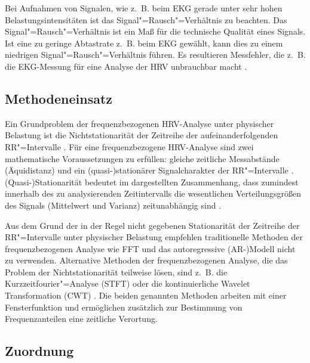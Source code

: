 Bei Aufnahmen von Signalen, wie z.~B. beim \ac{EKG} gerade unter sehr hohen Belastungsintensitäten ist das Signal"=Rausch"=Verhältnis zu beachten. Das Signal"=Rausch"=Verhältnis ist ein Maß für die technische Qualität eines Signals. Ist eine zu geringe Abtastrate z.~B. beim \ac{EKG} gewählt, kann dies zu einem niedrigen Signal"=Rausch"=Verhältnis führen. Es resultieren Messfehler, die z.~B. die \ac{EKG}-Messung für eine Analyse der \acs{HRV} unbrauchbar macht \citep{Hoos2010}.

\subsection{Methodeneinsatz} 

\label{sub:methodeneinsatz}

Ein Grundproblem der frequenzbezogenen \acs{HRV}-Analyse unter physischer Belastung ist die Nichtstationarität der Zeitreihe der aufeinanderfolgenden RR"=Intervalle \citep{Hottenrott2006}. Für eine frequenzbezogene \acs{HRV}-Analyse sind zwei mathematische Voraussetzungen zu erfüllen: gleiche zeitliche Messabstände (Äquidistanz) und ein (quasi-)stationärer Signalcharakter der RR"=Intervalle \citep{Hoos2006}. (Quasi-)Stationarität bedeutet im dargestellten Zusammenhang, dass zumindest innerhalb des zu analysierenden Zeitintervalls die wesentlichen Verteilungsgrößen des Signals (Mittelwert und Varianz) zeitunabhängig sind \citep{Hoos2006}.

Aus dem Grund der in der Regel nicht gegebenen Stationarität der Zeitreihe der RR"=Intervalle unter physischer Belastung empfehlen \citet[S.~113]{Sarmiento2013} traditionelle Methoden der frequenzbezogenen Analyse wie \acs{FFT} und das autoregressive (AR-)Modell nicht zu verwenden. Alternative Methoden der frequenzbezogenen Analyse, die das Problem der Nichtstationarität teilweise lösen, sind z.~B. die Kurzzeitfourier"=Analyse (STFT) oder die kontinuierliche Wavelet Transformation (CWT) \citep[][S.~61f.]{Hoos2010}. Die beiden genannten Methoden arbeiten mit einer Fensterfunktion und ermöglichen zusätzlich zur Bestimmung von Frequenzanteilen eine zeitliche Verortung. 

\subsection{Zuordnung} 

\label{sub:zuordnung}

